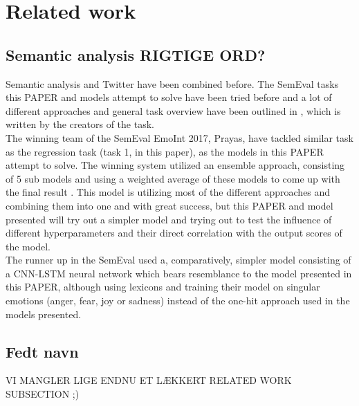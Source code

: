 
\section{Related work}

\subsection{Semantic analysis RIGTIGE ORD?}

Semantic analysis and Twitter have been combined before. The SemEval tasks this PAPER and models attempt to solve have been tried before and a lot of different approaches and general task overview have been outlined in \cite{wassa2017}, which is written by the creators of the task.\\
The winning team of the SemEval EmoInt 2017, Prayas, have tackled similar task as the regression task (task 1, in this paper), as the models in this PAPER attempt to solve. The winning system utilized an ensemble approach, consisting of 5 sub models and using a weighted average of these models to come up with the final result \cite{prayas}. This model is utilizing most of the different approaches and combining them into one and with great success, but this PAPER and model presented will try out a simpler model and trying out to test the influence of different hyperparameters and their direct correlation with the output scores of the model.\\
The runner up in the SemEval used a, comparatively, simpler model consisting of a CNN-LSTM neural network which bears resemblance to the model presented in this PAPER, although using lexicons and training their model on singular emotions (anger, fear, joy or sadness) instead of the one-hit approach used in the models presented.\\

\subsection{Fedt navn}

VI MANGLER LIGE ENDNU ET LÆKKERT RELATED WORK SUBSECTION ;)